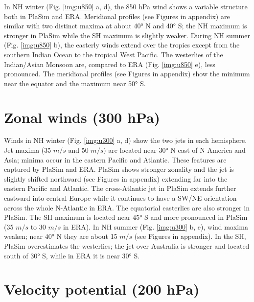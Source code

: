 \documentclass[12pt,a4paper,twoside,openright,headinclude,liststotoc,bibtotoc]{scrreprt}
\begin{document}
In NH winter (Fig. \ref{img:u850} a, d), the 850 hPa wind shows a variable structure both in PlaSim and ERA. Meridional profiles (see Figures in appendix) are similar with two distinct maxima at about 40° N and 40° S; the NH maximum is stronger in PlaSim while the SH maximum is slightly weaker. During NH summer (Fig. \ref{img:u850} b), the easterly winds extend over the tropics except from the southern Indian Ocean to the tropical West Pacific. The westerlies of the Indian/Asian Monsoon are, compared to ERA (Fig. \ref{img:u850} e), less pronounced. The meridional profiles (see Figures in appendix) show the minimum near the equator and the maximum near 50° S.


\vspace{-0.4cm}
\section{Zonal winds (300 hPa)}
\vspace{-0.4cm}

Winds in NH winter (Fig. \ref{img:u300} a, d) show the two jets in each hemisphere. Jet maxima (35 $m/s$ and 50 $m/s$) are located near 30° N east of N-America and Asia; minima occur in the eastern Pacific and Atlantic. These features are captured by PlaSim and ERA. PlaSim shows stronger zonality and the jet is slightly shifted northward (see Figures in appendix) extending far into the eastern Pacific and Atlantic. The cross-Atlantic jet in PlaSim extends further eastward into central Europe while it continues to have a SW/NE orientation across the whole N-Atlantic in ERA. The equatorial easterlies are also stronger in PlaSim. The SH maximum is located near 45° S and more pronounced in PlaSim (35 $m/s$ to 30 $m/s$ in ERA). In NH summer (Fig. \ref{img:u300} b, e), wind maxima weaken; near 40° N they are about 15 $m/s$ (see Figures in appendix). In the SH, PlaSim overestimates the westerlies; the jet over Australia is stronger and located south of 30° S, while in ERA it is near 30° S.

\vspace{-0.4cm}
\section{Velocity potential (200 hPa)}
\vspace{-0.4cm}
\end{document}
